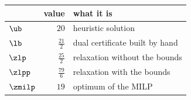 \begin{center}\small
\begin{tabular}{lrl}
\toprule
 & value & what it is \\
\midrule
$\ub$ & $20$ & heuristic solution \\
$\lb$ & $\frac{21}{2}$ & dual certificate built by hand \\
$\zlp$ & $\frac{25}{2}$ & relaxation without the bounds \\
$\zlpp$ & $\frac{79}{6}$ & relaxation with the bounds \\
$\zmilp$ & $19$ & optimum of the MILP \\
\bottomrule
\end{tabular}
\end{center}
